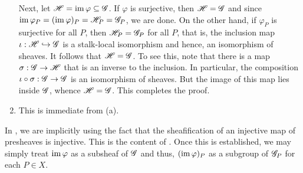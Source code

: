 \begin{exercise}
\begin{enumerate}[label=(\alph*)]
    Next, let $\mathscr{H} = \operatorname{im}\varphi\subseteq\mathscr{G}$. If $\varphi$ is surjective, then $\mathscr{H} = \mathscr{G}$ and since $\operatorname{im}\varphi_P = (\operatorname{im}\varphi)_P = \mathscr{H}_P = \mathscr{G}_P$, we are done. On the other hand, if $\varphi_P$ is surjective for all $P$, then $\mathscr{H}_P = \mathscr{G}_P$ for all $P$, that is, the inclusion map $\iota:\mathscr{H}\hookrightarrow\mathscr{G}$ is a stalk-local isomorphism and hence, an isomorphism of sheaves. It follows that $\mathscr{H} = \mathscr{G}$. To see this, note that there is a map $\sigma:\mathscr{G}\to\mathscr{H}$ that is an inverse to the inclusion. In particular, the composition $\iota\circ\sigma:\mathscr{G}\to\mathscr{G}$ is an isomorphism of sheaves. But the image of this map lies inside $\mathscr{G}$, whence $\mathscr{H} = \mathscr{G}$. This completes the proof.

    \item This is immediate from (a).
\end{enumerate}
\end{exercise}

\begin{remark}
    In , we are implicitly using the fact that the sheafification of an injective map of presheaves is injective. This is the content of . Once this is established, we may simply treat $\operatorname{im}\varphi$ as a subsheaf of $\mathscr{G}$ and thus, $(\operatorname{im}\varphi)_P$ as a subgroup of $\mathscr{G}_P$ for each $P\in X$.
\end{remark}

